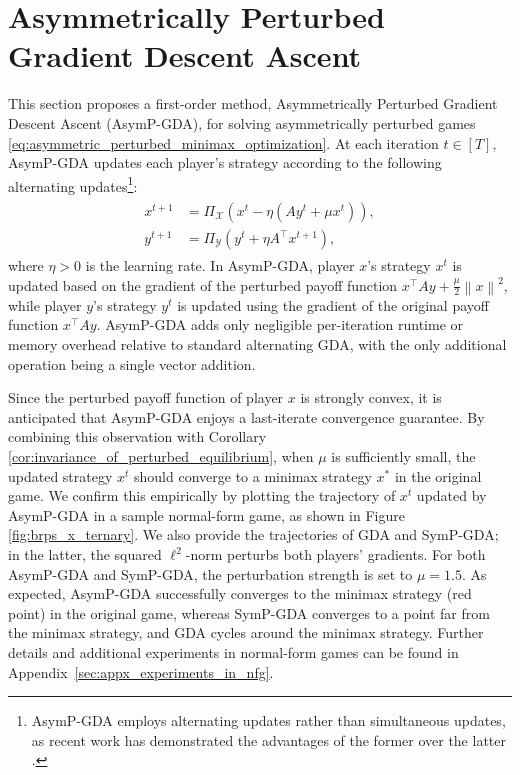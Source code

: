 \documentclass{article}
\newcommand{\X}{\mathcal{X}}
\newcommand{\Y}{\mathcal{Y}}
\theoremstyle{plain}
\begin{document}
\section{Asymmetrically Perturbed Gradient Descent Ascent}
\label{sec:gda}
This section proposes a first-order method, Asymmetrically Perturbed Gradient Descent Ascent (AsymP-GDA), for solving asymmetrically perturbed games \eqref{eq:asymmetric_perturbed_minimax_optimization}.
At each iteration $t\in [T]$, AsymP-GDA updates each player's strategy according to the following alternating updates\footnote{AsymP-GDA employs alternating updates rather than simultaneous updates, as recent work has demonstrated the advantages of the former over the latter \citep{lee2024fundamental}.}:
\begin{align}
    \begin{aligned}
        x^{t+1} & = \Pi_{\X} \left(x^t - \eta \left(Ay^t + \mu x^t\right)\right), \\
        y^{t+1} & = \Pi_{\Y} \left(y^t + \eta A^{\top}x^{t+1}\right),
    \end{aligned}
    \label{eq:asymmetrically_perturbed_gda}
\end{align}
where $\eta > 0$ is the learning rate.
In AsymP-GDA, player $x$'s strategy $x^t$ is updated based on the gradient of the perturbed payoff function $x^{\top}Ay + \frac{\mu}{2}\left\|x\right\|^2$, while player $y$'s strategy $y^t$ is updated using the gradient of the original payoff function $x^{\top}Ay$.
AsymP-GDA adds only negligible per-iteration runtime or memory overhead relative to standard alternating GDA, with the only additional operation being a single vector addition.

Since the perturbed payoff function of player $x$ is strongly convex, it is anticipated that AsymP-GDA enjoys a last-iterate convergence guarantee.
By combining this observation with Corollary \ref{cor:invariance_of_perturbed_equilibrium}, when $\mu$ is sufficiently small, the updated strategy $x^t$ should converge to a minimax strategy $x^{\ast}$ in the original game.
We confirm this empirically by plotting the trajectory of $x^t$ updated by AsymP-GDA in a sample normal-form game, as shown in Figure \ref{fig:brps_x_ternary}.
We also provide the trajectories of GDA and SymP-GDA; in the latter, the squared $\ell^2$-norm perturbs both players' gradients.
For both AsymP-GDA and SymP-GDA, the perturbation strength is set to $\mu=1.5$.
As expected, AsymP-GDA successfully converges to the minimax strategy (red point) in the original game, whereas SymP-GDA converges to a point far from the minimax strategy, and GDA cycles around the minimax strategy.
Further details and additional experiments in normal-form games can be found in Appendix~\ref{sec:appx_experiments_in_nfg}.
\end{document}
